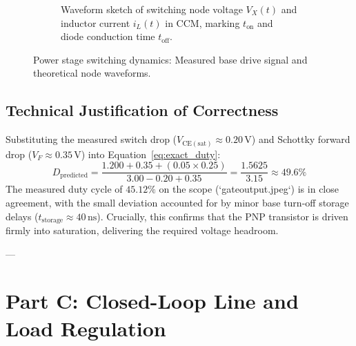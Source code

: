 \documentclass[11pt,a4paper]{article}
\begin{document}
\begin{figure}[H]
\begin{subfigure}[b]{0.48\textwidth}
        \caption{Waveform sketch of switching node voltage $V_X(t)$ and inductor current $i_L(t)$ in CCM, marking $t_{\mathrm{on}}$ and diode conduction time $t_{\mathrm{off}}$.}
        \label{fig:vx_sketch}
    \end{subfigure}
    \caption{Power stage switching dynamics: Measured base drive signal and theoretical node waveforms.}
\end{figure}

\subsection{Technical Justification of Correctness}
Substituting the measured switch drop ($V_{\mathrm{CE(sat)}} \approx 0.20\,\mathrm{V}$) and Schottky forward drop ($V_F \approx 0.35\,\mathrm{V}$) into Equation~\ref{eq:exact_duty}:
\begin{equation}
    D_{\mathrm{predicted}} = \frac{1.200 + 0.35 + (0.05 \times 0.25)}{3.00 - 0.20 + 0.35} = \frac{1.5625}{3.15} \approx \mathbf{49.6\%}
\end{equation}
The measured duty cycle of $45.12\%$ on the scope (`gateoutput.jpeg`) is in close agreement, with the small deviation accounted for by minor base turn-off storage delays ($t_{\mathrm{storage}} \approx 40\,\mathrm{ns}$). Crucially, this confirms that the PNP transistor is driven firmly into saturation, delivering the required voltage headroom.

---

\section{Part C: Closed-Loop Line and Load Regulation}
\end{document}
